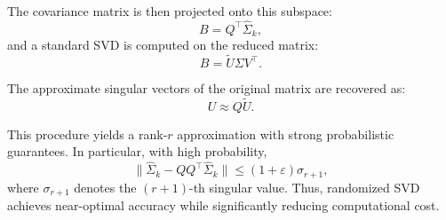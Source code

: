 \documentclass[12pt]{article}
\begin{document}
The covariance matrix is then projected onto this subspace:
\begin{equation}
B = Q^\top \hat{\Sigma}_k,
\end{equation}
and a standard SVD is computed on the reduced matrix:
\begin{equation}
B = \tilde{U} \Sigma V^\top.
\end{equation}

The approximate singular vectors of the original matrix are recovered as:
\begin{equation}
U \approx Q \tilde{U}.
\end{equation}

This procedure yields a rank-$r$ approximation with strong probabilistic guarantees. In particular, with high probability,
\begin{equation}
\| \hat{\Sigma}_k - QQ^\top \hat{\Sigma}_k \| \leq (1 + \varepsilon)\sigma_{r+1},
\end{equation}
where $\sigma_{r+1}$ denotes the $(r+1)$-th singular value. Thus, randomized SVD achieves near-optimal accuracy while significantly reducing computational cost.
\end{document}
